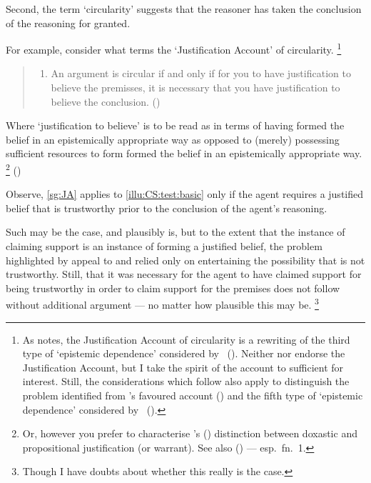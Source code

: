 \begin{note}
  Second, the term `circularity' suggests that the reasoner has taken the conclusion of the reasoning for granted.

  For example, consider what \citeauthor{Sgaravatti:2013wu} terms the `Justification Account' of circularity.\nolinebreak
  \footnote{
    As \citeauthor{Sgaravatti:2013wu} notes, the Justification Account of circularity is a rewriting of the third type of `epistemic dependence' considered by \citeauthor{Pryor:2004ws}~(\citeyear[359]{Pryor:2004ws}).
    Neither \citeauthor{Pryor:2004ws} nor \citeauthor{Sgaravatti:2013wu} endorse the Justification Account, but I take the spirit of the account to sufficient for interest.
    Still, the considerations which follow also apply to distinguish the {\color{red} problem identified} from \citeauthor{Sgaravatti:2013wu}'s favoured account (\Citeyear[\S3]{Sgaravatti:2013wu}) and the fifth type of `epistemic dependence' considered by \citeauthor{Pryor:2004ws}~(\citeyear[359]{Pryor:2004ws}).
  }

  \begin{quote}
    \begin{enumerate}[label=(JA), ref=(JA)]
    \item\label{sg:JA} An argument is circular if and only if for you to have justification to believe the premisses, it is necessary that you have justification to believe the conclusion.\nolinebreak
      \mbox{}\hfill\mbox{(\Citeyear[754]{Sgaravatti:2013wu})}
    \end{enumerate}
  \end{quote}
  Where `justification to believe' is to be read as in terms of having formed the belief in an epistemically appropriate way as opposed to (merely) possessing sufficient resources to form formed the belief in an epistemically appropriate way.\nolinebreak
  \footnote{
    Or, however you prefer to characterise \citeauthor{Firth:1978vi}'s (\Citeyear{Firth:1978vi}) distinction between doxastic and propositional justification (or warrant).
    See also \citeauthor{Silva:2020aa} (\Citeyear{Silva:2020aa}) --- esp.\ fn.\ 1.
  }
  (\citeauthor[Cf.][754--755]{Sgaravatti:2013wu})

  Observe, \ref{sg:JA} applies to \autoref{illu:CS:test:basic} only if the agent requires a justified belief that  is trustworthy prior to the conclusion of the agent's reasoning.

  Such may be the case, and plausibly is, but to the extent that the instance of claiming support is an instance of forming a justified belief, the problem highlighted by appeal to \ideaCSA{} and \ideaCSB{} relied only on entertaining the possibility that  is not trustworthy.
  Still, that it was necessary for the agent to have claimed support for  being trustworthy in order to claim support for the premises does not follow without additional argument --- no matter how plausible this may be.\nolinebreak
  \footnote{
    Though I have doubts about whether this really is the case.
  }


\end{note}
